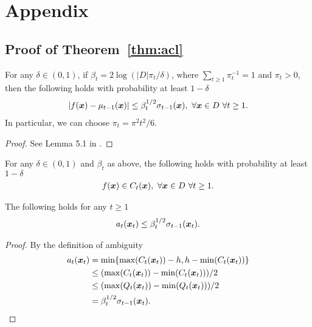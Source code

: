 ﻿\chapter{Appendix}

\section{Proof of Theorem~\ref*{thm:acl}} \label{sect:app_acl}

\begin{lemma}
\label{lem:srin1}
For any $\delta \in (0, 1)$, if $\beta_t = 2\log(|D|\pi_t/\delta)$, where
$\sum_{t\geq1}\pi_t^{-1} = 1$ and $\pi_t > 0$, then the following holds with
probability at least $1-\delta$
\begin{align*}
|f(\bm{x}) - \mu_{t-1}(\bm{x})| \leq \beta_t^{1/2}\sigma_{t-1}(\bm{x}),\ \forall \bm{x} \in D\ \forall t \geq 1.
\end{align*}
In particular, we can choose $\pi_t = \pi^2 t^2/6$.
\end{lemma}
\begin{proof}
See Lemma 5.1 in \cite{srinivas10}.
\end{proof}

\begin{cor}
\label{cor:cs}
For any $\delta \in (0, 1)$ and $\beta_t$ as above, the following holds
with probability at least $1-\delta$
\begin{align*}
f(\bm{x}) \in C_t(\bm{x}),\ \forall \bm{x} \in D\ \forall t \geq 1.
\end{align*}
\end{cor}

\begin{lemma}
\label{lem:wb}
The following holds for any $t \geq 1$
\begin{align*}
a_t(\bm{x}_t) \leq \beta_t^{1/2}\sigma_{t-1}(\bm{x}_t).
\end{align*}
\end{lemma}
\begin{proof}
By the definition of ambiguity
\begin{align*}
a_t(\bm{x}_t) &= \min\{\max(C_t(\bm{x}_t)) - h, h - \min(C_t(\bm{x}_t))\}\\
           &\leq (\max(C_t(\bm{x}_t)) - \min(C_t(\bm{x}_t)))/2\\
           &\leq (\max(Q_t(\bm{x}_t)) - \min(Q_t(\bm{x}_t)))/2\\
           &= \beta_t^{1/2}\sigma_{t-1}(\bm{x}_t).
\end{align*}
\end{proof}

